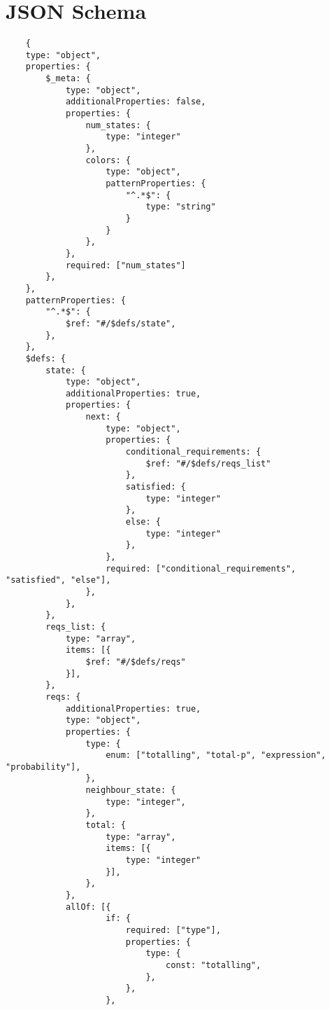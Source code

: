 \chapter{JSON Schema}
\label{appendix:jsonschema}

\begin{verbatim}
    {
    type: "object",
    properties: {
        $_meta: {
            type: "object",
            additionalProperties: false,
            properties: {
                num_states: {
                    type: "integer"
                },
                colors: {
                    type: "object",
                    patternProperties: {
                        "^.*$": {
                            type: "string"
                        }
                    }
                },
            },
            required: ["num_states"]
        },
    },
    patternProperties: {
        "^.*$": {
            $ref: "#/$defs/state",
        },
    },
    $defs: {
        state: {
            type: "object",
            additionalProperties: true,
            properties: {
                next: {
                    type: "object",
                    properties: {
                        conditional_requirements: {
                            $ref: "#/$defs/reqs_list"
                        },
                        satisfied: {
                            type: "integer"
                        },
                        else: {
                            type: "integer"
                        },
                    },
                    required: ["conditional_requirements", "satisfied", "else"],
                },
            },
        },
        reqs_list: {
            type: "array",
            items: [{
                $ref: "#/$defs/reqs"
            }],
        },
        reqs: {
            additionalProperties: true,
            type: "object",
            properties: {
                type: {
                    enum: ["totalling", "total-p", "expression", "probability"],
                },
                neighbour_state: {
                    type: "integer",
                },
                total: {
                    type: "array",
                    items: [{
                        type: "integer"
                    }],
                },
            },
            allOf: [{
                    if: {
                        required: ["type"],
                        properties: {
                            type: {
                                const: "totalling",
                            },
                        },
                    },

\end{verbatim}
